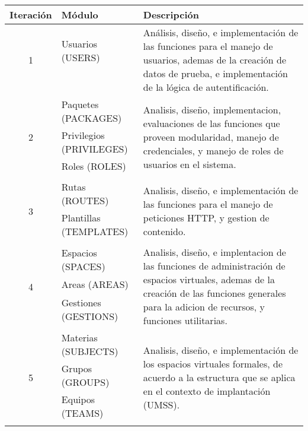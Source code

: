 \begin{table}
\centering
\begin{tabular}{|c|l|p{8.0cm}|}
\hline
Iteración & Módulo & Descripción \\
\hline

\multirow{4}{*}{1} &
Usuarios (USERS) &
\multirow{4}{8cm}{Análisis, diseño, e implementación de las funciones para el
manejo de usuarios, ademas de la creación de datos de prueba, e implementación
de la lógica de autentificación.} \\
 &  & \\
 &  & \\
 &  & \\
\hline

\multirow{4}{*}{2} &
Paquetes (PACKAGES) &
\multirow{4}{8cm}{Analisis, diseño, implementacion, evaluaciones de las
funciones que proveen modularidad, manejo de credenciales, y manejo de roles de
usuarios en el sistema.} \\
 & Privilegios (PRIVILEGES) & \\
 & Roles (ROLES) & \\
 &  & \\
\hline

\multirow{3}{*}{3} &
Rutas (ROUTES) &
\multirow{3}{8cm}{Analisis, diseño, e implementación de las funciones para el
manejo de peticiones HTTP, y gestion de contenido.} \\
 & Plantillas (TEMPLATES) & \\
 & & \\
\hline

\multirow{4}{*}{4} &
Espacios (SPACES) &
\multirow{4}{8cm}{Analisis, diseño, e implentacion de las funciones de
administración de espacios virtuales, ademas de la creación de las funciones
generales para la adicion de recursos, y funciones utilitarias.} \\
 & Areas (AREAS) & \\
 & Gestiones (GESTIONS) & \\
 & & \\
\hline

\multirow{4}{*}{5} &
Materias (SUBJECTS) &
\multirow{4}{8cm}{Analisis, diseño, e implementación de los espacios virtuales
formales, de acuerdo a la estructura que se aplica en el contexto de
implantación (UMSS).} \\
 & Grupos (GROUPS) & \\
 & Equipos (TEAMS) & \\
 & & \\
\hline


\end{tabular}
\end{table}
